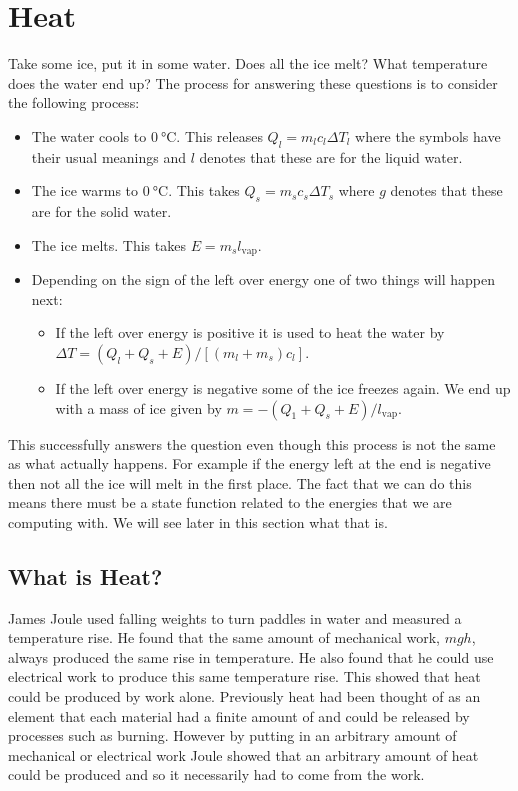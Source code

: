 \documentclass[a4paper]{article}
\begin{document}
    \section{Heat}
    Take some ice, put it in some water.
    Does all the ice melt?
    What temperature does the water end up?
    The process for answering these questions is to consider the following process:
    \begin{itemize}
        \item The water cools to \(\SI{0}{\degreeCelsius}\).
        This releases \(Q_l = m_lc_l\Delta T_l\) where the symbols have their usual meanings and \(l\) denotes that these are for the liquid water.
        \item The ice warms to \(\SI{0}{\degreeCelsius}\).
        This takes \(Q_s = m_sc_s \Delta T_s\) where \(g\) denotes that these are for the solid water.
        \item The ice melts. This takes \(E = m_s l_\text{vap}\).
        \item Depending on the sign of the left over energy one of two things will happen next:
        \begin{itemize}
            \item If the left over energy is positive it is used to heat the water by \(\Delta T = (Q_l + Q_s + E)/[(m_l + m_s)c_l]\).
            \item If the left over energy is negative some of the ice freezes again.
            We end up with a mass of ice given by \(m = -(Q_1 + Q_s + E)/l_\text{vap}\).
        \end{itemize}
    \end{itemize}
    This successfully answers the question even though this process is not the same as what actually happens.
    For example if the energy left at the end is negative then not all the ice will melt in the first place.
    The fact that we can do this means there must be a state function related to the energies that we are computing with.
    We will see later in this section what that is.
    
    \subsection{What is Heat?}
    James Joule used falling weights to turn paddles in water and measured a temperature rise.
    He found that the same amount of mechanical work, \(mgh\), always produced the same rise in temperature.
    He also found that he could use electrical work to produce this same temperature rise.
    This showed that heat could be produced by work alone.
    Previously heat had been thought of as an element that each material had a finite amount of and could be released by processes such as burning.
    However by putting in an arbitrary amount of mechanical or electrical work Joule showed that an arbitrary amount of heat could be produced and so it necessarily had to come from the work.
    
\end{document}
